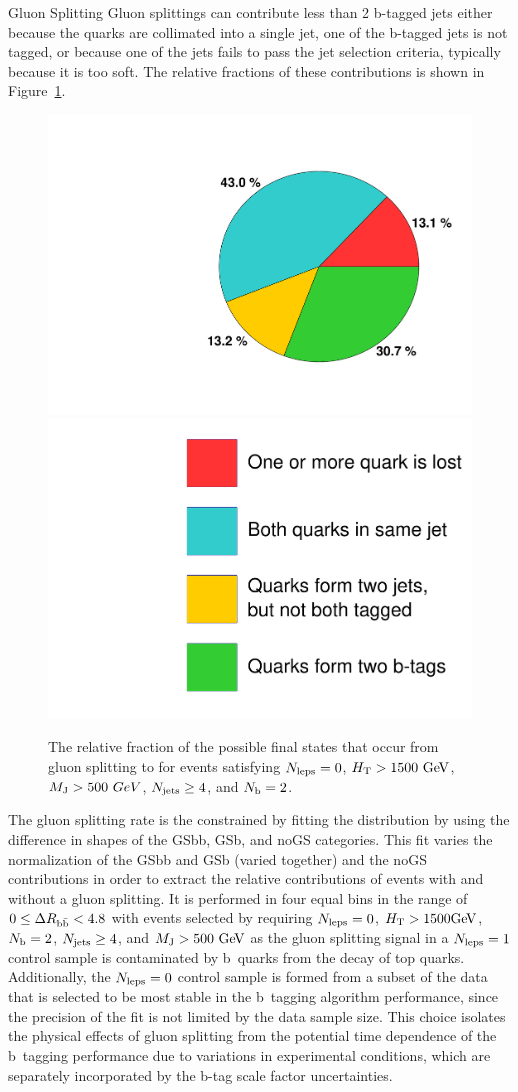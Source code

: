 \begin{section}{Gluon Splitting}
Gluon splittings can contribute less than 2 b-tagged jets either because the quarks are collimated into a single jet, one of the b-tagged jets is not tagged, or because one of the jets fails to pass the jet selection criteria, typically because it is too soft.
The relative fractions of these contributions is shown in Figure~\ref{fig:gs_categories}.

\begin{figure}[tbp!]
\begin{center}
\includegraphics[angle=0,width=0.45\columnwidth]{fig/gs_piechart.pdf}
\includegraphics[angle=0,width=0.45\columnwidth]{fig/gs_piechart_legend.pdf}
\end{center}
\caption{The relative fraction of the possible final states that occur from gluon splitting to \bbbar for events satisfying $N_{\mathrm{leps}}=0$, $H_\mathrm{T} > 1500~\mathrm{Ge\kern -0.1em V}$, $M_\mathrm{J} > 500~GeV$, $N_{\mathrm{jets}} \geq 4$, and $N_\mathrm{b}=2$.}
\label{fig:gs_categories}
\end{figure}

The gluon splitting rate is the constrained by fitting the \dRbb distribution by using the difference in shapes of the GSbb, GSb, and noGS categories.
This fit varies the normalization of the GSbb and GSb (varied together) and the noGS contributions in order to extract the relative contributions of events with and without a gluon splitting.
It is performed in four equal bins in the range of $0 \leq \Delta R_{\mathrm{b\bar{b}}} < 4.8$ with events selected by requiring $N_{\mathrm{leps}} = 0$, $H_\mathrm{T} > 1500\mathrm{Ge\kern -0.1em V}$, $N_\mathrm{b} = 2$, $N_{\mathrm{jets}} \geq 4$, and $M_\mathrm{J} > 500~\mathrm{Ge\kern -0.1em V}$ as the gluon splitting signal in a $N_{\mathrm{leps}} = 1$ control sample is contaminated by b~quarks from the decay of top quarks.
Additionally, the $N_{\mathrm{leps}} = 0$ control sample is formed from a subset of the data that is selected to be most stable in the b~tagging algorithm performance, since the precision of the \dRbb fit is not limited by the data sample size.
This choice isolates the physical effects of gluon splitting from the potential time dependence of the b~tagging performance due to variations in experimental conditions, which are separately incorporated by the b-tag scale factor uncertainties.


\end{section}
